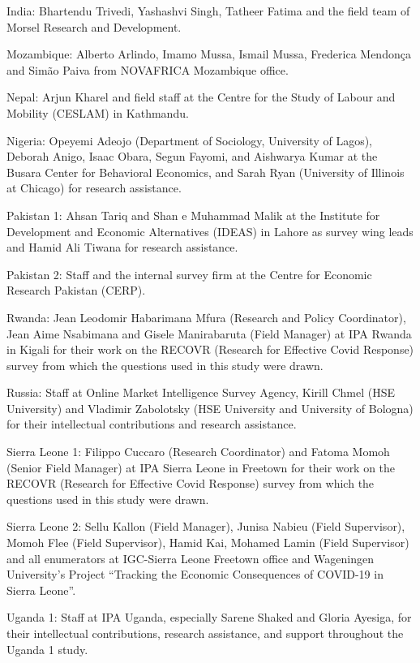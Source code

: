 \documentclass[
  12pt,
]{article}
\begin{document}
India: Bhartendu Trivedi, Yashashvi Singh, Tatheer Fatima and the field team of Morsel Research and Development.

Mozambique: Alberto Arlindo, Imamo Mussa, Ismail Mussa, Frederica Mendonça and Simão Paiva from NOVAFRICA Mozambique office.

Nepal: Arjun Kharel and field staff at the Centre for the Study of Labour and Mobility (CESLAM) in Kathmandu.

Nigeria: Opeyemi Adeojo (Department of Sociology, University of Lagos), Deborah Anigo, Isaac Obara, Segun Fayomi, and Aishwarya Kumar at the Busara Center for Behavioral Economics, and Sarah Ryan (University of Illinois at Chicago) for research assistance.

Pakistan 1: Ahsan Tariq and Shan e Muhammad Malik at the Institute for Development and Economic Alternatives (IDEAS) in Lahore as survey wing leads and Hamid Ali Tiwana for research assistance.

Pakistan 2: Staff and the internal survey firm at the Centre for Economic Research Pakistan (CERP).

Rwanda: Jean Leodomir Habarimana Mfura (Research and Policy Coordinator), Jean Aime Nsabimana and Gisele Manirabaruta (Field Manager) at IPA Rwanda in Kigali for their work on the RECOVR (Research for Effective Covid Response) survey from which the questions used in this study were drawn.

Russia: Staff at Online Market Intelligence Survey Agency, Kirill Chmel (HSE University) and Vladimir Zabolotsky (HSE University and University of Bologna) for their intellectual contributions and research assistance.

Sierra Leone 1: Filippo Cuccaro (Research Coordinator) and Fatoma Momoh (Senior Field Manager) at IPA Sierra Leone in Freetown for their work on the RECOVR (Research for Effective Covid Response) survey from which the questions used in this study were drawn.

Sierra Leone 2: Sellu Kallon (Field Manager), Junisa Nabieu (Field Supervisor), Momoh Flee (Field Supervisor), Hamid Kai, Mohamed Lamin (Field Supervisor) and all enumerators at IGC-Sierra Leone Freetown office and Wageningen University's Project ``Tracking the Economic Consequences of COVID-19 in Sierra Leone''.

Uganda 1: Staff at IPA Uganda, especially Sarene Shaked and Gloria Ayesiga, for their intellectual contributions, research assistance, and support throughout the Uganda 1 study.
\end{document}

